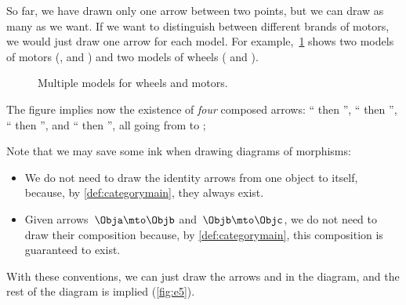 So far, we have drawn only one arrow between two points, but we can draw as many as we want.
If we want to distinguish between different brands of motors, we would just draw one arrow for each model.
For example,~\cref{fig:e4bis} shows two models of motors (, and ) and two models of wheels ( and ).

\begin{figure}[h!]
	\centering
	\caption{Multiple models for wheels and motors.}
	\label{fig:e4bis}
\end{figure}

The figure implies now the existence of \emph{four} composed arrows: `` then '', `` then '', `` then '', and `` then '', all going from \translationalmotion to \electricpower;





Note that we may save some ink when drawing diagrams of morphisms:
\begin{itemize}
	\item We do not need to draw the identity arrows from one object to itself, because, by \cref{def:categorymain}, they always exist.
	\item  Given arrows~$\Obja \mto \Objb$ and~$\Objb \mto \Objc$, we do not need to draw their composition because, by \cref{def:categorymain}, this composition is guaranteed to exist.
\end{itemize}

With these conventions, we can just draw the arrows \motor and \wheels in the diagram, and the rest of the diagram is implied (\cref{fig:e5}).

